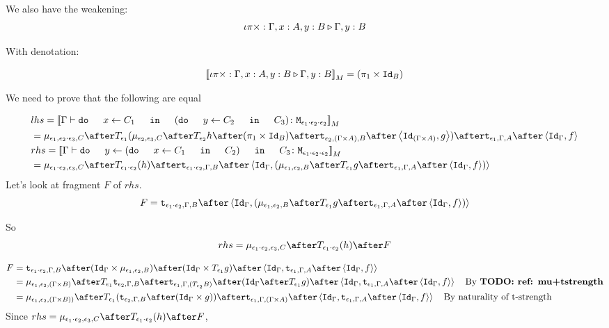 \documentclass{report}
\begin{document}
    We also have the weakening:
    \begin{equation}
        \iota\pi\times : \Gamma, x: A, y: B \triangleright \Gamma, y: B
    \end{equation}

    With denotation:

    \begin{equation}
        {\bf [\![}\iota\pi\times : \Gamma, x: A, y: B \triangleright \Gamma, y: B{\bf ]\!]}_M = (\pi_1 \times \texttt{Id}_{B})
    \end{equation}

    We need to prove that the following are equal

    \begin{align}
        &lhs =  \deno{\gtyperelation{\doin{x}{C_1}{(\doin{y}{C_2}{C_3})}}{\M{\e_1\dot\e_2\dot\e_2}}} \\
        & = \bind{\e_1}{\e_2\dot\e_3}{C}\after\T{
            \e_1}{(\bind{\e_2}{\e_3}{C}\after\T{\e_2}{h\after(\p \times \Id{B})}\after\tstrength{\e_2}{(\G\times A)}{B}\after\pr{\Id{(\G\times A)}}{g}
            )}\after\tstrength{\e_1}{\G}{A}\after\pr{\idg}{f}\\
        & rhs = \deno{\gtyperelation{\doin{y}{(\doin{x}{C_1}{C_2})}{C_3}}{\M{\e_1\dot\e_2\dot\e_2}}}  \\
        & = \bind{\e_1\dot\e_2}{\e_3}{C}\after\T{\e_1\dot\e_2}{(h)}\after\tstrength{\e_1\dot\e_2}{\G}{B}\after\pr{\idg}{(\bind{\e_1}{\e_2}{B}\after\T{\e_1}{g}\after\tstrength{\e_1}{\G}{A}\after\pr{\idg}{f})} \\
    \end{align}
    Let's look at fragment $F$ of $rhs$.
    \begin{equation}
        F = \tstrength{\e_1\dot\e_2}{\G}{B}\after\pr{\idg}{(\bind{\e_1}{\e_2}{B}\after\T{\e_1}{g}\after\tstrength{\e_1}{\G}{A}\after\pr{\idg}{f})}
    \end{equation}

    So 
    \begin{equation}
        rhs = \bind{\e_1\dot\e_2}{\e_3}{C}\after\T{\e_1\dot\e_2}{(h)}\after F
    \end{equation}

    \begin{equation}
        \begin{split}
            F & = \tstrength{\e_1\dot\e_2}{\G}{B}\after(\idg\times\bind{\e_1}{\e_2}{B})\after(\idg\times\T{\e_1}{g})\after\pr{\idg}{\tstrength{\e_1}{\G}{A}\after\pr{\idg}{f}}\\
            &  = \bind{\e_1}{\e_2}{(\G\times B)} \after \T{\e_1}{\tstrength{\e_2}{\G}{B}} \after\tstrength{\e_1}{\G}{(\T{\e_2}{B})} \after (\idg \after\T{\e_1}{g})\after\pr{\idg}{\tstrength{\e_1}{\G}{A}\after\pr{\idg}{f}}\quad\text{By \todo{ref: mu+tstrength}}
            \\ & = \bind{\e_1}{\e_2}{(\G \times B))} \after \T{\e_1}{(\tstrength{\e_2}{\G}{B} \after (\idg \times g))} \after \tstrength{\e_1}{\G}{(\G \times A)} \after \pr{\idg}{\tstrength{\e_1}{\G}{A}\after\pr{\idg}{f}}\quad\text{By naturality of t-strength}
        \end{split}
    \end{equation}
    Since
    $
        rhs = \bind{\e_1\dot\e_2}{\e_3}{C}\after\T{\e_1\dot\e_2}{(h)}\after F
    $, 
\end{document}
